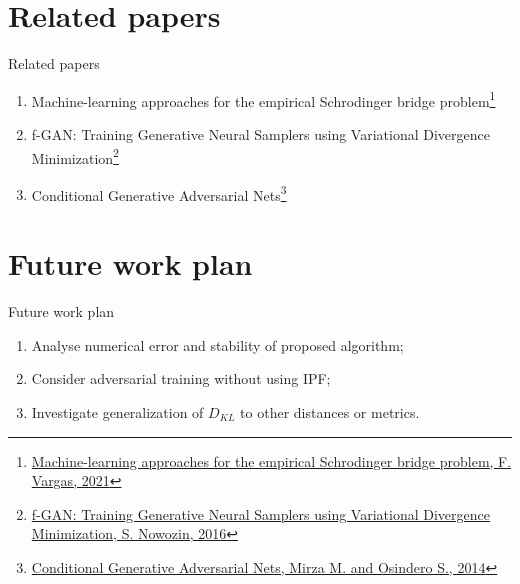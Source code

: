 \documentclass[10pt,pdf,hyperref={unicode}]{beamer}
\begin{document}
\section{Related papers}
\begin{frame}{Related papers}
\begin{enumerate}[1.]
    \item Machine-learning approaches for the empirical Schrodinger bridge problem\footnote{\href{https://www.cl.cam.ac.uk/techreports/UCAM-CL-TR-958.pdf}{Machine-learning approaches for the empirical Schrodinger bridge problem, F. Vargas, 2021}}
    \item f-GAN: Training Generative Neural Samplers using Variational Divergence Minimization\footnote{\href{https://arxiv.org/abs/1606.00709}{f-GAN: Training Generative Neural Samplers using Variational Divergence Minimization, S. Nowozin, 2016}}
    \item Conditional Generative Adversarial Nets\footnote{\href{ https://arxiv.org/abs/1411.1784}{Conditional Generative Adversarial Nets, Mirza M. and Osindero S., 2014}}
\end{enumerate}
\end{frame}
\section{Future work plan}
\begin{frame}{Future work plan}
\begin{enumerate}[1.]
    \item Analyse numerical error and stability of proposed algorithm;
    \item Consider adversarial training without using IPF;
    \item Investigate generalization of $D_{KL}$ to other distances or metrics.
\end{enumerate}
\end{frame}
\end{document}
